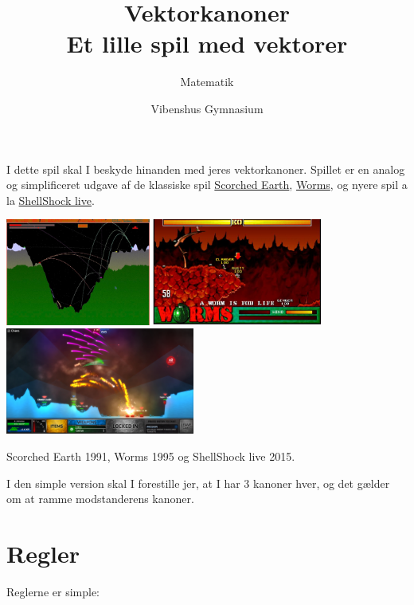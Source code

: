 \documentclass[a4paper, 12pt]{article}
\author{Matematik}
\date{Vibenshus Gymnasium}
\title{Vektorkanoner\\\medskip
\large Et lille spil med vektorer}
\begin{document}
\maketitle
I dette spil skal I beskyde hinanden med jeres vektorkanoner. Spillet er en analog og simplificeret udgave af de klassiske spil \href{https://playclassic.games/games/strategy-dos-games-online/play-scorched-earth-online/}{Scorched Earth}, \href{https://playclassic.games/games/turn-based-strategy-dos-games-online/play-worms-online/}{Worms}, og nyere spil a la \href{http://www.shellshocklive.com/}{ShellShock live}.


\begin{center}
\includegraphics[height=3.5cm]{img/2022-10-26_13-46-35_screenshot.png}
\includegraphics[height=3.5cm]{img/2022-10-26_13-54-06_screenshot.png}
\includegraphics[height=3.5cm]{img/mindre.png}
\end{center}

Scorched Earth 1991, Worms 1995 og ShellShock live 2015.

I den simple version skal I forestille jer, at I har 3 kanoner hver, og det gælder om at ramme modstanderens kanoner.

\section*{Regler}
\label{sec:org3760467}
Reglerne er simple:
\end{document}
